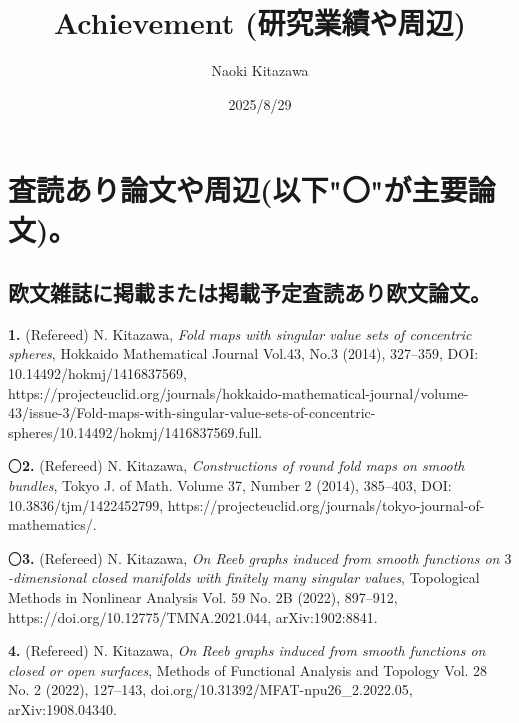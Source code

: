\documentclass{article}
\begin{document}
\title{Achievement (研究業績や周辺)}
\author{Naoki Kitazawa}
\date{2025/8/29}
\maketitle
%
%
%
%
\noindent 
\section{査読あり論文や周辺(以下"〇"が主要論文)。}
\subsection{欧文雑誌に掲載または掲載予定査読あり欧文論文。}

{\bf 1.} (Refereed) N. Kitazawa, \textsl{Fold maps with singular value sets of concentric spheres}, Hokkaido Mathematical Journal Vol.43, No.3 (2014), 327--359, DOI: 10.14492/hokmj/1416837569, \\
https://projecteuclid.org/journals/hokkaido-mathematical-journal/volume-43/issue-3/Fold-maps-with-singular-value-sets-of-concentric-spheres/10.14492/hokmj/1416837569.full.

\par\noindent
〇{\bf 2.} (Refereed) N. Kitazawa, \textsl{Constructions of round fold maps on smooth bundles}, Tokyo J. of Math. Volume 37, Number 2 (2014), 385--403, DOI: 10.3836/tjm/1422452799, https://projecteuclid.org/journals/tokyo-journal-of-mathematics/.%

\par\noindent
〇{\bf 3.} (Refereed) N. Kitazawa, \textsl{On Reeb graphs induced from smooth functions on $3$-dimensional closed manifolds with finitely many singular values}, Topological Methods in Nonlinear Analysis Vol. 59 No. 2B (2022), 897--912, https://doi.org/10.12775/TMNA.2021.044, arXiv:1902:8841.

\par\noindent
{\bf 4.} (Refereed) N. Kitazawa, \textsl{On Reeb graphs induced from smooth functions on closed or open surfaces}, Methods of Functional Analysis and Topology Vol. 28 No. 2 (2022), 127--143, doi.org/10.31392/MFAT-npu26\_2.2022.05, arXiv:1908.04340.
\end{document}
